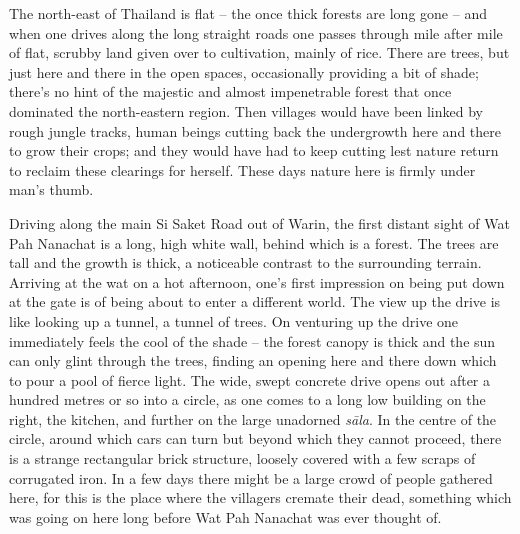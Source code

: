 
The north-east of Thailand is flat -- the once thick forests are long
gone -- and when one drives along the long straight roads one passes
through mile after mile of flat, scrubby land given over to cultivation, 
mainly of rice. There are trees, but just here and there in the open
spaces, occasionally providing a bit of shade; there's no hint of the
majestic and almost impenetrable forest that once dominated the
north-eastern region. Then villages would have been linked by rough
jungle tracks, human beings cutting back the undergrowth here and there
to grow their crops; and they would have had to keep cutting lest nature
return to reclaim these clearings for herself. These days nature here is
firmly under man's thumb. 

Driving along the main Si Saket Road out of Warin, the first distant
sight of Wat Pah Nanachat is a long, high white wall, behind which is a
forest. The trees are tall and the growth is thick, a noticeable
contrast to the surrounding terrain. Arriving at the wat on a hot
afternoon, one's first impression on being put down at the gate is of
being about to enter a different world. The view up the drive is like
looking up a tunnel, a tunnel of trees. On venturing up the drive one
immediately feels the cool of the shade -- the forest canopy is thick
and the sun can only glint through the trees, finding an opening here
and there down which to pour a pool of fierce light. The wide, swept
concrete drive opens out after a hundred metres or so into a circle, as
one comes to a long low building on the right, the kitchen, and further
on the large unadorned \emph{sāla}. In the centre of the circle, around
which cars can turn but beyond which they cannot proceed, there is a
strange rectangular brick structure, loosely covered with a few scraps
of corrugated iron. In a few days there might be a large crowd of people
gathered here, for this is the place where the villagers cremate their
dead, something which was going on here long before Wat Pah Nanachat was
ever thought of. 

